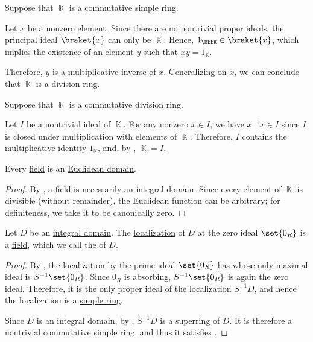 \begin{defproof}
   Suppose that \( \BbbK \) is a commutative simple ring.

  Let \( x \) be a nonzero element. Since there are no nontrivial proper ideals, the principal ideal \( \braket{ x } \) can only be \( \BbbK \). Hence, \( 1_\BbbK \in \braket{ x } \), which implies the existence of an element \( y \) such that \( xy = 1_\BbbK \).

  Therefore, \( y \) is a multiplicative inverse of \( x \). Generalizing on \( x \), we can conclude that \( \BbbK \) is a division ring.

   Suppose that \( \BbbK \) is a commutative division ring.

  Let \( I \) be a nontrivial ideal of \( \BbbK \). For any nonzero \( x \in I \), we have \( x^{-1} x \in I \) since \( I \) is closed under multiplication with elements of \( \BbbK \). Therefore, \( I \) contains the multiplicative identity \( 1_\BbbK \), and, by , \( \BbbK = I \).
\end{defproof}

\begin{proposition}\label{thm:field_is_euclidean_domain}
  Every \hyperref[def:field]{field} is an \hyperref[def:euclidean_domain]{Euclidean domain}.
\end{proposition}
\begin{proof}
  By , a field is necessarily an integral domain. Since every element of \( \BbbK \) is divisible (without remainder), the Euclidean function can be arbitrary; for definiteness, we take it to be canonically zero.
\end{proof}

\begin{proposition}\label{thm:field_of_fractions}
  Let \( D \) be an \hyperref[def:integral_domain]{integral domain}. The \hyperref[def:ring_localization]{localization} of \( D \) at the zero ideal \( \set{ 0_R } \) is a \hyperref[def:field]{field}, which we call the  of \( D \).
\end{proposition}
\begin{proof}
  By , the localization by the prime ideal \( \set{ 0_R } \) has  whose only maximal ideal is \( S^{-1} \set{ 0_R } \). Since \( 0_R \) is absorbing, \( S^{-1} \set{ 0_R } \) is again the zero ideal.  Therefore, it is the only proper ideal of the localization \( S^{-1} D \), and hence the localization is a \hyperref[def:ring/simple]{simple ring}.

  Since \( D \) is an integral domain, by , \( S^{-1} D \) is a superring of \( D \). It is therefore a nontrivial commutative simple ring, and thus it satisfies .
\end{proof}

